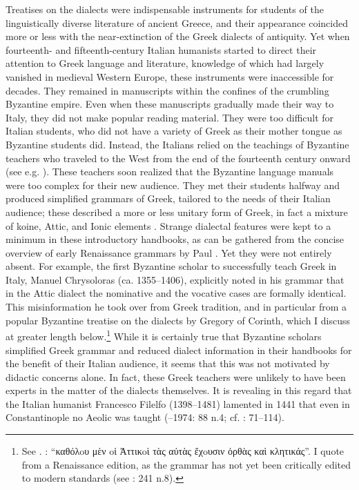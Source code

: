 Treatises on the dialects were indispensable instruments for students of the linguistically diverse literature of ancient Greece, and their appearance coincided more or less with the near-extinction of the Greek dialects of antiquity. Yet when fourteenth- and fifteenth-century Italian humanists started to direct their attention to Greek language and literature, knowledge of which had largely vanished in medieval Western Europe, these instruments were inaccessible for decades. They remained in manuscripts within the confines of the crumbling Byzantine empire. Even when these manuscripts gradually made their way to Italy, they did not make popular reading material. They were too difficult for Italian students, who did not have a variety of Greek as their mother tongue as Byzantine students did. Instead, the Italians relied on the teachings of Byzantine teachers who traveled to the West from the end of the fourteenth century onward (see e.g. \citealt{Harris1995,Botley2010,Wilson2016}). These teachers soon realized that the Byzantine language manuals were too complex for their new audience. They met their students halfway and produced simplified grammars of Greek, tailored to the needs of their Italian audience; these described a more or less unitary form of Greek, in fact a mixture of koine, Attic, and Ionic elements \citep[123]{Ciccolella2008}. Strange dialectal features were kept to a minimum in these introductory handbooks, as can be gathered from the concise overview of early Renaissance grammars by Paul \citet{Botley2010}. Yet they were not entirely absent. For example, the first Byzantine scholar to successfully teach Greek in Italy, Manuel Chrysoloras (ca. 1355–1406), explicitly noted in his grammar that in the Attic dialect the nominative and the vocative cases are formally identical. This misinformation he took over from Greek tradition, and in particular from a popular Byzantine treatise on the dialects by Gregory of Corinth, which I discuss at greater length below.\footnote{See \textcite[166 n.70]{Botley2010}. \citet[20]{Chrysoloras1512}: “καθόλoυ μὲν oἱ Ἀττικoὶ τὰς αὐτὰς ἔχoυσιν ὀρθὰς καὶ κλητικάς”. I quote from a Renaissance edition, as the grammar has not yet been critically edited to modern standards (see \citealt{Nuti2013}: 241 n.8).} While it is certainly true that Byzantine scholars simplified Greek grammar and reduced dialect information in their handbooks for the benefit of their Italian audience, it seems that this was not motivated by didactic concerns alone. In fact, these Greek teachers were unlikely to have been experts in the matter of the dialects themselves. It is revealing in this regard that the Italian humanist Francesco Filelfo (1398–1481) lamented in 1441 that even in Constantinople no Aeolic was taught (\citealt{Rotolo1973}–1974: 88 n.4; cf. \citealt{Botley2010}: 71–114).

